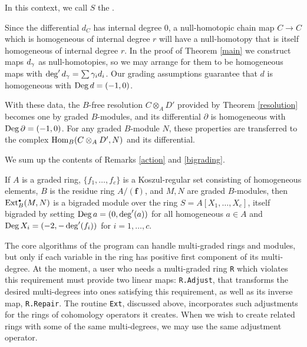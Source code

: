 \begin{Remark}
In this context, we call $S$ the {\it{}\/}.

Since the differential $d_C$ has internal degree $0$, a null-homotopic
chain map $C\to C$ which is homogeneous of internal degree $r$ will
have a null-homotopy that is itself homogeneous of internal degree
$r$.  In the proof of Theorem \ref{main} we construct maps $d_\gamma$ as
null-homotopies, so we may arrange for them to be homogeneous maps with
$\deg' d_\gamma = \sum \gamma_i d_i$.  Our grading assumptions guarantee that
$d$ is homogeneous with $\operatorname{Deg} d=(-1,0)$.

With these data, the $B$-free resolution $C\otimes_A D'$ provided by
Theorem \ref{resolution} becomes one by graded $B$-modules, and
its differential $\partial$ is homogeneous with $\operatorname{Deg}
\partial=(-1,0)$.  For any graded $B$-module $N$, these properties are
transferred to the complex $\operatorname{Hom}_B(C\otimes_A D',N)$ and its
differential.
 \end{Remark}

We sum up the contents of Remarks \ref{action} and \ref{bigrading}.

\begin{Remark}
\label{graded action}
If $A$ is a graded ring, $\{f_1, \dots, f_c\}$ is a Koszul-regular set
consisting of homogeneous elements, $B$ is the residue ring
$A/({\boldsymbol f})$, and $M,N$ are graded $B$-modules, then
$\operatorname{Ext}^{\scriptscriptstyle\bullet}_B(M,N)$ is a bigraded module over the ring
$S=A[X_1,\dots,X_c]$, itself bigraded by setting $\operatorname{Deg} a = (0,
\deg'(a))$ for all homogeneous $a\in A$ and $\operatorname{Deg} X_i =
(-2,-\deg'(f_i))$ for $i=1,\dots,c$.
 \end{Remark}

\begin{Remark}
\label{macaulay grading}
The core algorithms of the program can handle multi-graded rings and
modules, but only if each variable in the ring has positive first
component of its multi-degree.  At the moment, a user who needs a
multi-graded ring {\tt R} which violates this requirement must provide
two linear maps: {\tt R.Adjust}, that transforms the desired
multi-degrees into ones satisfying this requirement, as well as its
inverse map, {\tt R.Repair}.  The routine {\tt Ext}, discussed above,
incorporates such adjustments for the rings of cohomology operators it
creates.  When we wish to create related rings with some of the same
multi-degrees, we may use the same adjustment operator.
 \end{Remark}

